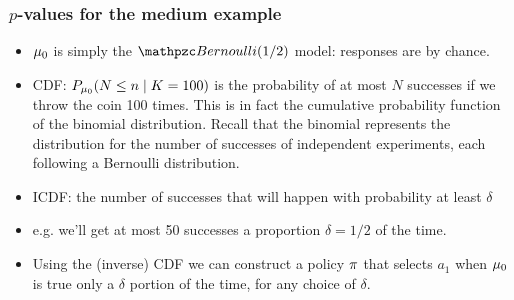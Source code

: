 {\begin{frame}\frametitle{$p$-values for the medium example}
  \begin{itemize}
  \item<2->$\mu_0$ is simply the $\Bernoulli(1/2)$ model:
    responses are by chance. 
  \item<3->CDF: $P_{\mu_0}(N \leq n \mid K = 100)$  {is the probability of at most $N$ successes if we throw the coin 100 times. This is in fact the cumulative probability function of the binomial distribution. Recall that the binomial represents the distribution for the number of successes of independent experiments, each following a Bernoulli distribution.}
  \item<4->ICDF:  the number of successes that will happen with probability at least $\delta$
  \item<5->e.g. we'll get at most 50 successes a proportion $\delta = 1/2$ of the time.
  \item<6>Using the (inverse) CDF we can construct a policy $\pi$ that selects $a_1$ when $\mu_0$ is true only a $\delta$ portion of the time, for any choice of $\delta$.
  \end{itemize}
  \begin{columns}
    \setlength{}
    \setlength{}
    \begin{column}{0.5\textwidth}
    \end{column}
    \begin{column}{0.5\textwidth}
    \end{column}
  \end{columns}    
\end{frame}



}
